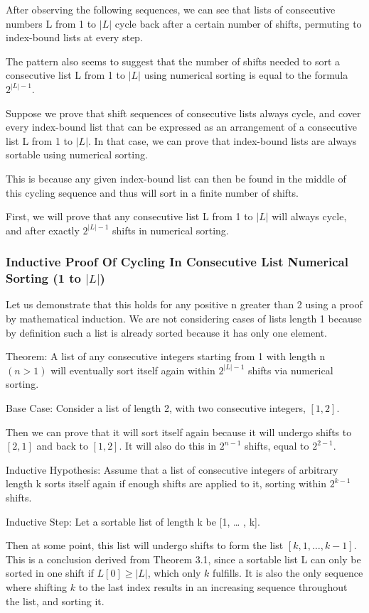 \documentclass[12pt]{article}
\begin{document}
After observing the following sequences, we can see that lists of consecutive numbers L from 1 to $|L|$ cycle back after a certain number of shifts, permuting to index-bound lists at every step.

The pattern also seems to suggest that the number of shifts needed to sort a consecutive list L from 1 to $|L|$ using numerical sorting is equal to the formula $2^{|L|-1}$.

Suppose we prove that shift sequences of consecutive lists always cycle, and cover every index-bound list that can be expressed as an arrangement of a consecutive list L from 1 to $|L|$. In that case, we can prove that index-bound lists are always sortable using numerical sorting.

This is because any given index-bound list can then be found in the middle of this cycling sequence and thus will sort in a finite number of shifts.

First, we will prove that any consecutive list L from 1 to $|L|$ will always cycle, and after exactly $2^{|L|-1}$ shifts in numerical sorting.

\subsubsection{Inductive Proof Of Cycling In Consecutive List Numerical Sorting (1 to $|L|$)}

Let us demonstrate that this holds for any positive n greater than 2 using a proof by mathematical induction. We are not considering cases of lists length 1 because by definition such a list is already sorted because it has only one element.

Theorem:
A list of any consecutive integers starting from 1 with length n $(n > 1)$ will eventually sort itself again within $2^{|L|-1}$ shifts via numerical sorting.

Base Case:
Consider a list of length 2, with two consecutive integers, $[1,2]$. 

Then we can prove that it will sort itself again because it will undergo shifts to $[2,1]$ and back to $[1,2]$. It will also do this in $2^{n-1}$ shifts, equal to $2^{2-1}$.

Inductive Hypothesis:
Assume that a list of consecutive integers of arbitrary length k sorts itself again if enough shifts are applied to it, sorting within $2^{k-1}$ shifts.

Inductive Step:
Let a sortable list of length k be [1, … , k].

Then at some point, this list will undergo shifts to form the list $[k, 1, …, k-1]$. This is a conclusion derived from Theorem 3.1, since a sortable list L can only be sorted in one shift if $L[0] \geq |L|$, which only $k$ fulfills. It is also the only sequence where shifting $k$ to the last index results in an increasing sequence throughout the list, and sorting it.
\end{document}
